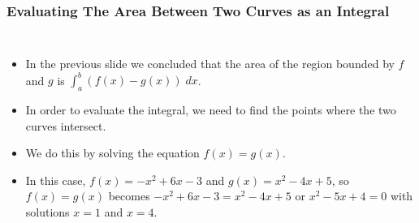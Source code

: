 \documentclass[serif,ignorenonframetext]{beamer}
\newcommand{\ds}{\displaystyle}
\begin{document}
\begin{frame}
  \frametitle{Evaluating The Area Between Two Curves as an Integral}
  \begin{columns}
  \begin{itemize}[<+->]
  \item In the previous slide we concluded that the area of the region
    bounded by $f$ and $g$ is $\ds \int_a^b (f(x)-g(x)) \; dx$.
  \item In order to evaluate the integral, we need to find the points
    where the two curves intersect.
  \item We do this by solving the equation $f(x)=g(x)$.
  \item In this case, $f(x)=-x^2+6x-3$ and $g(x)=x^2-4x+5$, so
    $f(x)=g(x)$ becomes $-x^2+6x-3=x^2-4x+5$ or
    $x^2-5x+4=0$ with solutions $x=1$ and $x=4$.
  \end{itemize}
  \end{columns}
\end{frame}
\end{document}
